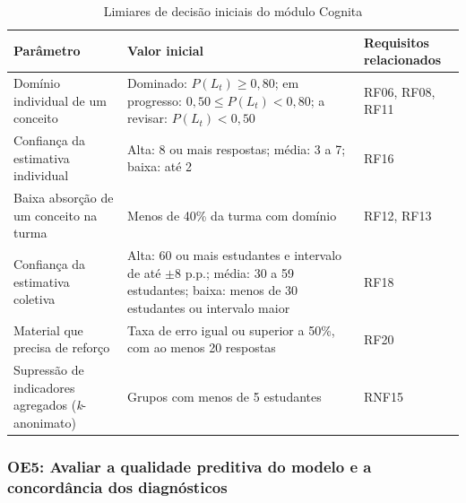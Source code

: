 \begin{table}[htb]
\caption{Limiares de decisão iniciais do módulo Cognita}
\label{tab:limiares}
\centering
\small
\begin{tabularx}{\textwidth}{>{\raggedright\arraybackslash}p{4.2cm}>{\raggedright\arraybackslash}X>{\raggedright\arraybackslash}p{3.6cm}}
\hline
\textbf{Parâmetro} & \textbf{Valor inicial} & \textbf{Requisitos relacionados} \\
\hline
Domínio individual de um conceito & Dominado: $P(L_t) \ge 0{,}80$; em progresso: $0{,}50 \le P(L_t) < 0{,}80$; a revisar: $P(L_t) < 0{,}50$ & RF06, RF08, RF11 \\
\hline
Confiança da estimativa individual & Alta: 8 ou mais respostas; média: 3 a 7; baixa: até 2 & RF16 \\
\hline
Baixa absorção de um conceito na turma & Menos de 40\% da turma com domínio & RF12, RF13 \\
\hline
Confiança da estimativa coletiva & Alta: 60 ou mais estudantes e intervalo de até $\pm 8$ p.p.; média: 30 a 59 estudantes; baixa: menos de 30 estudantes ou intervalo maior & RF18 \\
\hline
Material que precisa de reforço & Taxa de erro igual ou superior a 50\%, com ao menos 20 respostas & RF20 \\
\hline
Supressão de indicadores agregados (\textit{k}-anonimato) & Grupos com menos de 5 estudantes & RNF15 \\
\hline
\end{tabularx}
\end{table}

\subsubsection{OE5: Avaliar a qualidade preditiva do modelo e a concordância dos diagnósticos}
\label{subsubsec:oe5}

